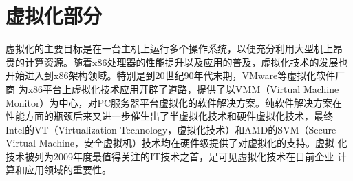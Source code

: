 \part{虚拟化部分}
\label{part:virtualization}

虚拟化的主要目标是在一台主机上运行多个操作系统，以便充分利用大型机上昂
贵的计算资源。随着x86处理器的性能提升以及应用的普及，虚拟化技术的发展也
开始进入到x86架构领域。特别是到20世纪90年代末期，VMware等虚拟化软件厂商
为x86平台上虚拟化技术应用开辟了道路，提供了以VMM（Virtual Machine
  Monitor）为中心，对PC服务器平台虚拟化的软件解决方案。纯软件解决方案在
性能方面的瓶颈后来又进一步催生出了半虚拟化技术和硬件虚拟化技术，最终
Intel的VT（Virtualization Technology，虚拟化技术）和AMD的SVM（Secure
  Virtual Machine，安全虚拟机）技术均在硬件级提供了对虚拟化的支持。虚拟
化技术被列为2009年度最值得关注的IT技术之首，足可见虚拟化技术在目前企业
计算和应用领域的重要性。






